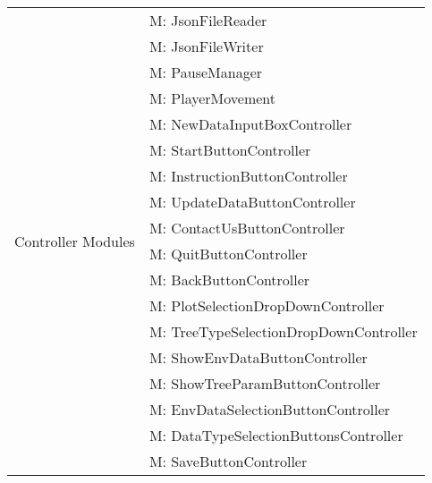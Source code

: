 \documentclass[12pt, titlepage]{article}
\newcounter{mnum}
\newcommand{\mthemnum}{M\themnum}
\begin{document}
\begin{table}[H]
\begin{tabular}{p{} p{}}
\multirow{18}{0.3\textwidth}{Controller Modules}
& {mnum} \mthemnum \label{Controller1}: JsonFileReader \\
& {mnum} \mthemnum \label{Controller2}: JsonFileWriter  \\
& {mnum} \mthemnum \label{Controller3}: PauseManager  \\
& {mnum} \mthemnum \label{Controller4}: PlayerMovement  \\
& {mnum} \mthemnum \label{Controller5}: NewDataInputBoxController\\
& {mnum} \mthemnum \label{Controller6}: StartButtonController  \\
& {mnum} \mthemnum \label{Controller7}: InstructionButtonController \\
& {mnum} \mthemnum \label{Controller8}: UpdateDataButtonController\\
& {mnum} \mthemnum \label{Controller9}: ContactUsButtonController \\
& {mnum} \mthemnum \label{Controller10}: QuitButtonController  \\
& {mnum} \mthemnum \label{Controller11}: BackButtonController \\
& {mnum} \mthemnum \label{Controller12}: PlotSelectionDropDownController \\
& {mnum} \mthemnum \label{Controller13}: TreeTypeSelectionDropDownController \\
& {mnum} \mthemnum \label{Controller14}: ShowEnvDataButtonController \\
& {mnum} \mthemnum \label{Controller15}: ShowTreeParamButtonController \\
& {mnum} \mthemnum \label{Controller16}: EnvDataSelectionButtonController\\
& {mnum} \mthemnum \label{Controller17}: DataTypeSelectionButtonsController \\
& {mnum} \mthemnum \label{Controller18}: SaveButtonController \\
\bottomrule

\end{tabular}

\end{table}
\end{document}
